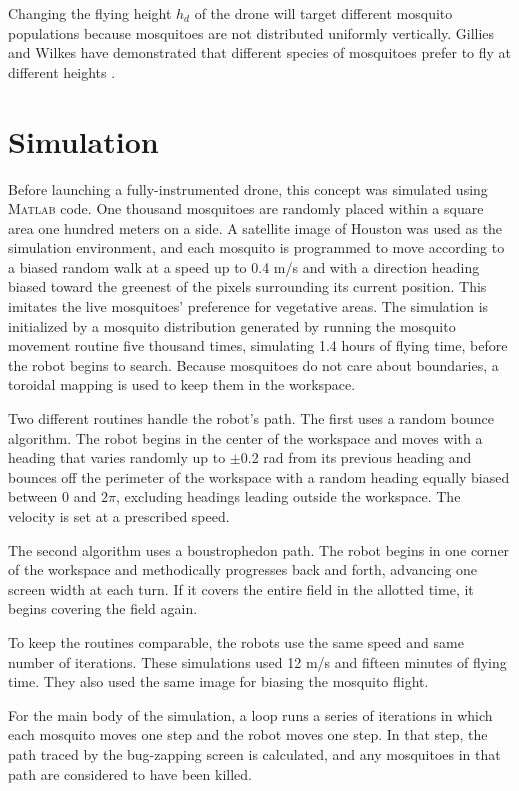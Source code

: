 \documentclass[letterpaper, 10 pt, conference]{ieeeconf}  %
\begin{document}
Changing the flying height $h_d$ of the drone will target different mosquito populations   because mosquitoes are not distributed uniformly vertically.  Gillies and Wilkes have demonstrated that different species of mosquitoes prefer to fly at different heights \cite{gillies1976vertical}.
  
  
    \section{Simulation}
    
   Before launching a fully-instrumented drone, this concept was simulated using \textsc{Matlab} code.  One thousand mosquitoes are randomly placed within a square area one hundred meters on a side.  A satellite image of Houston was used as the simulation environment, and each mosquito is programmed to move according to a biased random walk at a speed up to 0.4 m/s and with a direction heading biased toward the greenest of the pixels surrounding its current position.  This imitates the live mosquitoes' preference for vegetative areas.  
   The simulation is initialized by a mosquito distribution generated by running the mosquito movement routine  five thousand times, simulating 1.4 hours of flying time, before the robot begins to search.  Because mosquitoes do not care about boundaries, a toroidal mapping is used to keep them in the workspace.
    
Two different routines handle the robot's path.  The first uses a random bounce algorithm.  The robot begins in the center of the workspace and moves with a heading that varies randomly up to $\pm$0.2 rad from its previous heading and bounces off the perimeter of the workspace with a random heading equally biased between 0 and $2\pi$, excluding headings leading outside the workspace.  The velocity is set at a prescribed speed.

The second algorithm uses a boustrophedon path.  The robot begins in one corner of the workspace and methodically progresses back and forth, advancing one screen width at each turn.  If it covers the entire field in the allotted time, it begins covering the field again.

To keep the routines comparable, the robots use the same speed and same number of iterations.  These simulations used 12 m/s and fifteen minutes of flying time.  They also used the same image for biasing the mosquito flight.

For the main body of the simulation, a loop runs a series of iterations in which each mosquito moves one step and the robot moves one step.  In that step, the path traced by the bug-zapping screen is calculated, and any mosquitoes in that path are considered to have been killed.
\end{document}
